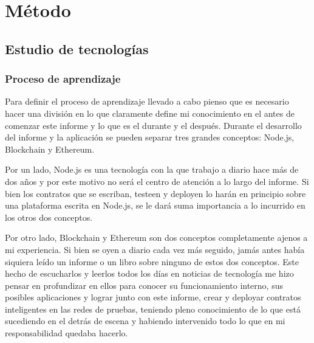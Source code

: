 \chapter{Método}

\ifpdf
    \graphicspath{{Chapter3/Figs/Raster/}{Chapter3/Figs/PDF/}{Chapter3/Figs/}}
\else
    \graphicspath{{Chapter3/Figs/Vector/}{Chapter3/Figs/}}
\fi

\section{Estudio de tecnologías}

\subsection{Proceso de aprendizaje}

Para definir el proceso de aprendizaje llevado a cabo pienso que es necesario hacer una división en
lo que claramente define mi conocimiento en el antes de comenzar este informe y lo que es el
durante y el después. Durante el desarrollo del informe y la aplicación se pueden separar tres
grandes conceptos: Node.js, Blockchain y Ethereum.

Por un lado, Node.js es una tecnología con la que trabajo a diario hace más de dos años y por este
motivo no será el centro de atención a lo largo del informe. Si bien los contratos que se escriban, 
testeen y deployen lo harán en principio sobre una plataforma escrita en Node.js, se le dará suma
importancia a lo incurrido en los otros dos conceptos.

Por otro lado, Blockchain y Ethereum son dos conceptos completamente ajenos a mi experiencia. Si 
bien se oyen a diario cada vez más seguido, jamás antes había siquiera leído un informe o un libro
sobre ninguno de estos dos conceptos. Este hecho de escucharlos y leerlos todos los días en 
noticias de tecnología me hizo pensar en profundizar en ellos para conocer su funcionamiento 
interno, sus posibles aplicaciones y lograr junto con este informe, crear y deployar contratos 
inteligentes en las redes de pruebas, teniendo pleno conocimiento de lo que está sucediendo en el 
detrás de escena y habiendo intervenido todo lo que en mi responsabilidad quedaba hacerlo.

